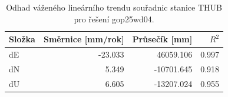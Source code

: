 \begin{table}[htbp]
\caption{Odhad váženého lineárního trendu souřadnic stanice THUB pro řešení gop25wd04.}
\label{tab:gop25wd04_stcd_thub_weighted_1seg}
\begin{tabular}{lrrr}
\toprule
Složka & Směrnice [mm/rok] & Průsečík [mm] & $R^2$ \\
\midrule
dE & -23.033 & 46059.106 & 0.997 \\
dN & 5.349 & -10701.645 & 0.918 \\
dU & 6.605 & -13207.024 & 0.955 \\
\bottomrule
\end{tabular}
\end{table}
